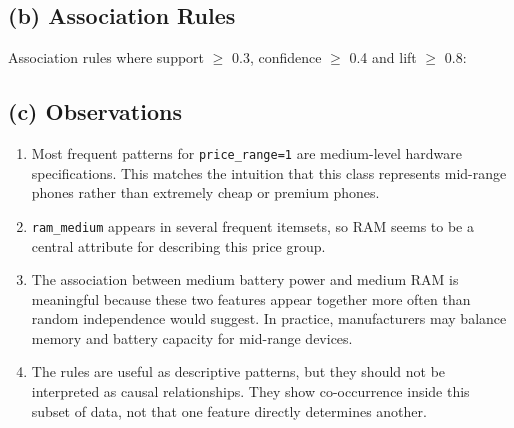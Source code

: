 \documentclass[11pt, a4paper]{article}
\begin{document}
\subsection*{(b) Association Rules}
Association rules where support $\geq$ 0.3, confidence $\geq$ 0.4 and lift $\geq$ 0.8:
\begin{table}[H]
    \centering
    \caption{Association rules meeting the specified criteria.}
\end{table}

\subsection*{(c) Observations}
\begin{enumerate}
    \item Most frequent patterns for \texttt{price\_range=1} are medium-level hardware specifications. This matches the intuition that this class represents mid-range phones rather than extremely cheap or premium phones.
    \item \texttt{ram\_medium} appears in several frequent itemsets, so RAM seems to be a central attribute for describing this price group.
    \item The association between medium battery power and medium RAM is meaningful because these two features appear together more often than random independence would suggest. In practice, manufacturers may balance memory and battery capacity for mid-range devices.
    \item The rules are useful as descriptive patterns, but they should not be interpreted as causal relationships. They show co-occurrence inside this subset of data, not that one feature directly determines another.
\end{enumerate}
\end{document}
